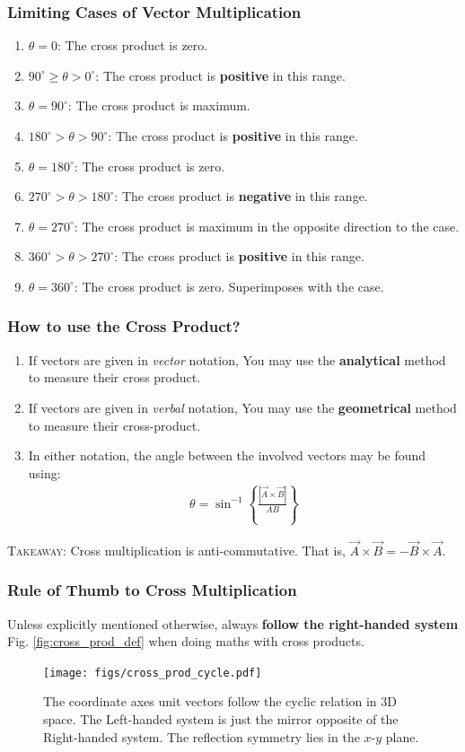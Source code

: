 \documentclass[12pt,b4paper]{article}
\begin{document}
\subsubsection*{Limiting Cases of Vector Multiplication}
\begin{enumerate}
    \item $\theta=0$: The cross product is zero.
    \item $90^\circ\geq\theta>0^\circ$: The cross product is \textbf{positive} in this range.
    \item $\theta=90^\circ$: The cross product is maximum.
    \item $180^\circ>\theta>90^\circ$: The cross product is \textbf{positive} in this range.
    \item $\theta=180^\circ$: The cross product is zero.
    \item $270^\circ>\theta>180^\circ$: The cross product is \textbf{negative} in this range.
    \item $\theta=270^\circ$: The cross product is maximum in the opposite direction to the  case.
    \item $360^\circ>\theta>270^\circ$: The cross product is \textbf{positive} in this range.
    \item $\theta=360^\circ$: The cross product is zero. Superimposes with the  case.
\end{enumerate}
\subsubsection*{How to use the Cross Product?}
\begin{enumerate}
    \item If vectors are given in \textit{vector} notation, You may use the \textbf{analytical} method to measure their cross product.
    \item If vectors are given in \textit{verbal} notation, You may use the \textbf{geometrical} method to measure their cross-product.
    \item In either notation, the angle between the involved vectors may be found using:
    \begin{align}
        \theta=\sin^{-1}\left\{\frac{\left|\Vec{A}\times\Vec{B}\right|}{AB}\right\}
    \end{align}
\end{enumerate}
\textsc{Takeaway}: Cross multiplication is anti-commutative. That is, $\Vec{A}\times\Vec{B}=-\Vec{B}\times\Vec{A}$.
\subsubsection*{Rule of Thumb to Cross Multiplication}
Unless explicitly mentioned otherwise, always \textbf{follow the right-handed system} Fig. \ref{fig:cross_prod_def} when doing maths with cross products.
\begin{figure}[H]
    \centering
    \texttt{[image: figs/cross\_prod\_cycle.pdf]}
    \caption{The coordinate axes unit vectors follow the cyclic relation in 3D space. The Left-handed system is just the mirror opposite of the Right-handed system. The reflection symmetry lies in the $x$-$y$ plane.}
    \label{fig:cross_prod_cycle}
\end{figure}
\thispagestyle{empty}
\end{document}
